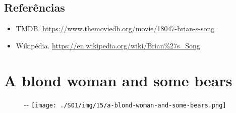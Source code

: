\hypertarget{referuxeancias-1}{%
\subsection{Referências}\label{referuxeancias-1}}

\begin{itemize}
\tightlist
\item
  \sloppy TMDB. \url{https://www.themoviedb.org/movie/18047-brian-s-song}
\item
  \sloppy Wikipédia. \url{https://en.wikipedia.org/wiki/Brian%27s_Song}
\end{itemize}

\hypertarget{a-blond-woman-and-some-bears}{%
\section{A blond woman and some
bears}\label{a-blond-woman-and-some-bears}}

\begin{figure}[!ht]
  \begin{adjustwidth}{-\oddsidemargin-1in}{-\rightmargin}
    \centering
    \texttt{[image: ./S01/img/15/a-blond-woman-and-some-bears.png]}
  \end{adjustwidth}
\end{figure}

